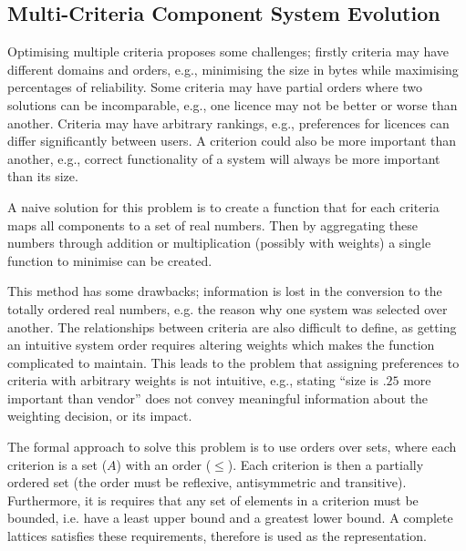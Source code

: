\subsection{Multi-Criteria Component System Evolution}
Optimising multiple criteria proposes some challenges; firstly criteria may have different domains and orders, 
e.g., minimising the size in bytes while maximising percentages of reliability. 
Some criteria may have partial orders where two solutions can be incomparable,
e.g., one licence may not be better or worse than another.
Criteria may have arbitrary rankings, 
e.g., preferences for licences can differ significantly between users.
A criterion could also be more important than another, 
e.g., correct functionality of a system will always be more important than its size.

A naive solution for this problem is to create a function that for each criteria maps all components to a set of real numbers.
Then by aggregating these numbers through addition or multiplication (possibly with weights) a single function to minimise can be created. 

This method has some drawbacks;
information is lost in the conversion to the totally ordered real numbers,
e.g. the reason why one system was selected over another.
The relationships between criteria are also difficult to define, as getting an intuitive system order requires altering weights which makes the function complicated to maintain.
This leads to the problem that assigning preferences to criteria with arbitrary weights is not intuitive,
e.g., stating ``size is $.25$ more important than vendor'' does not convey meaningful information about the weighting decision, or its impact.

The formal approach to solve this problem is to use orders over sets, 
where each criterion is a set ($A$) with an order ($\leq$).
Each criterion is then a partially ordered set (the order must be reflexive, antisymmetric and transitive).
Furthermore, it is requires that any set of elements in a criterion must be bounded, 
i.e. have a least upper bound and a greatest lower bound.
A complete lattices satisfies these requirements, therefore is used as the representation. 

